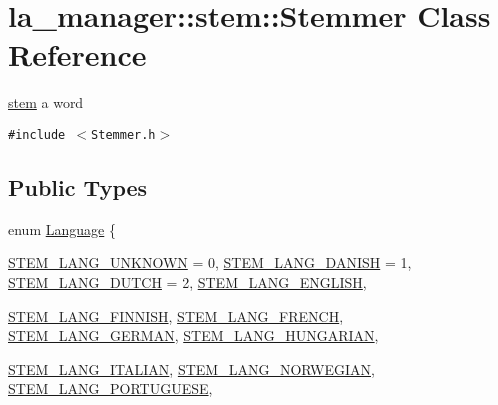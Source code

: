 \hypertarget{classla__manager_1_1stem_1_1Stemmer}{
\section{la\_\-manager::stem::Stemmer Class Reference}
\label{classla__manager_1_1stem_1_1Stemmer}
}
\hyperlink{namespacela__manager_1_1stem}{stem} a word  


{\tt \#include $<$Stemmer.h$>$}

\subsection*{Public Types}
\begin{CompactItemize}
\item 
enum \hyperlink{classla__manager_1_1stem_1_1Stemmer_9b35ed1ce313d309f8c7235f7052e73e}{Language} \{ \par
\hyperlink{classla__manager_1_1stem_1_1Stemmer_9b35ed1ce313d309f8c7235f7052e73e98b4457ca894503ea3933a27a8da06ee}{STEM\_\-LANG\_\-UNKNOWN} =  0, 
\hyperlink{classla__manager_1_1stem_1_1Stemmer_9b35ed1ce313d309f8c7235f7052e73e9074254ee214fc2e0db4a5d872f3e481}{STEM\_\-LANG\_\-DANISH} =  1, 
\hyperlink{classla__manager_1_1stem_1_1Stemmer_9b35ed1ce313d309f8c7235f7052e73e33a98941274b92cfbf6e08843b2b8ba8}{STEM\_\-LANG\_\-DUTCH} =  2, 
\hyperlink{classla__manager_1_1stem_1_1Stemmer_9b35ed1ce313d309f8c7235f7052e73e51454a9517abf9637f777698ef4931d8}{STEM\_\-LANG\_\-ENGLISH}, 
\par
\hyperlink{classla__manager_1_1stem_1_1Stemmer_9b35ed1ce313d309f8c7235f7052e73e105280190a31a37c59d8f26fb2cc849c}{STEM\_\-LANG\_\-FINNISH}, 
\hyperlink{classla__manager_1_1stem_1_1Stemmer_9b35ed1ce313d309f8c7235f7052e73e99e13de29b055f10a1f7ae474a4ca8ae}{STEM\_\-LANG\_\-FRENCH}, 
\hyperlink{classla__manager_1_1stem_1_1Stemmer_9b35ed1ce313d309f8c7235f7052e73e4e401bbcad2a0071a3f527afdb910322}{STEM\_\-LANG\_\-GERMAN}, 
\hyperlink{classla__manager_1_1stem_1_1Stemmer_9b35ed1ce313d309f8c7235f7052e73e13238ba5350bd2da5c9470136f983caf}{STEM\_\-LANG\_\-HUNGARIAN}, 
\par
\hyperlink{classla__manager_1_1stem_1_1Stemmer_9b35ed1ce313d309f8c7235f7052e73ea31283bfc055548f7788ee4e15ddee8b}{STEM\_\-LANG\_\-ITALIAN}, 
\hyperlink{classla__manager_1_1stem_1_1Stemmer_9b35ed1ce313d309f8c7235f7052e73ef1d3ae5536a879e5d2106340afb4bdde}{STEM\_\-LANG\_\-NORWEGIAN}, 
\hyperlink{classla__manager_1_1stem_1_1Stemmer_9b35ed1ce313d309f8c7235f7052e73ea4bd75d84f889ef6891f9c766d2b3f4f}{STEM\_\-LANG\_\-PORTUGUESE}, 

\end{CompactItemize}
